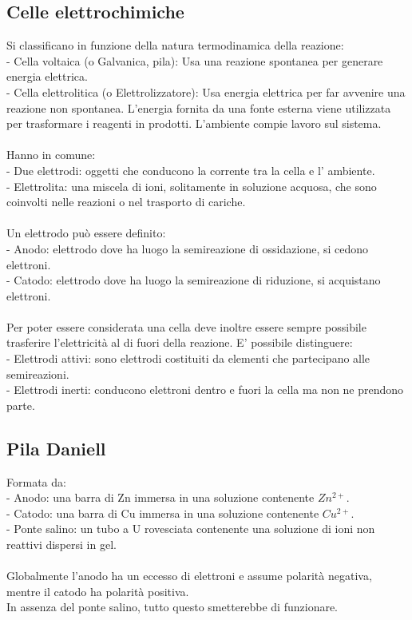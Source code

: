 \subsection{Celle elettrochimiche}
Si classificano in funzione della natura termodinamica della reazione:\\
\tab- Cella voltaica (o Galvanica, pila): Usa una reazione spontanea per generare energia elettrica.\\
\tab- Cella elettrolitica (o Elettrolizzatore): Usa energia elettrica per far avvenire una reazione non spontanea. L'energia fornita da una fonte esterna viene utilizzata per trasformare i reagenti in prodotti. L'ambiente compie lavoro sul sistema.\\\\
Hanno in comune:\\
\tab- Due elettrodi: oggetti che conducono la corrente tra la cella e l' ambiente.\\
\tab- Elettrolita: una miscela di ioni, solitamente in soluzione acquosa, che sono coinvolti nelle reazioni o nel trasporto di cariche.\\\\
Un elettrodo può essere definito:\\
\tab- Anodo: elettrodo dove ha luogo la semireazione di ossidazione, si cedono elettroni.\\
\tab- Catodo: elettrodo dove ha luogo la semireazione di riduzione, si acquistano elettroni. \\\\
Per poter essere considerata una cella deve inoltre essere sempre possibile trasferire l'elettricità al di fuori della reazione.
E' possibile distinguere:\\
\tab- Elettrodi attivi: sono elettrodi costituiti da elementi che partecipano alle semireazioni.\\
\tab- Elettrodi inerti: conducono elettroni dentro e fuori la cella ma non ne prendono parte.
\subsection{Pila Daniell}
Formata da:\\
\tab- Anodo: una barra di Zn immersa in una soluzione contenente $Zn^{2+}$.\\
\tab- Catodo: una barra di Cu immersa in una soluzione contenente $Cu^{2+}$.\\
\tab- Ponte salino: un tubo a U rovesciata contenente una soluzione di ioni non reattivi dispersi in gel.\\\\
Globalmente l'anodo ha un eccesso di elettroni e assume polarità negativa, mentre il catodo ha polarità positiva.\\
In assenza del ponte salino, tutto questo smetterebbe di funzionare.
